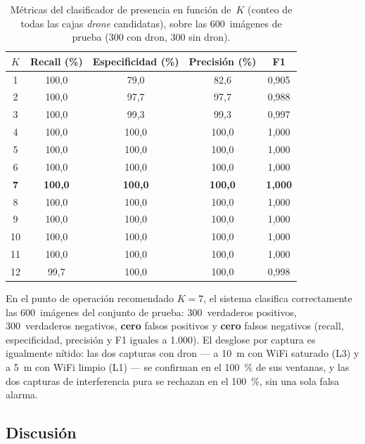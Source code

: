 \begin{table}[htbp]
\centering
\caption{Métricas del clasificador de presencia en función de~$K$ (conteo de todas las cajas \emph{drone} candidatas), sobre las \num{600}~imágenes de prueba (\num{300} con dron, \num{300} sin dron).}
\label{tab:presencia_sweep_k}
\begin{tabular}{ccccc}
\toprule
\textbf{$K$} & \textbf{Recall (\%)} & \textbf{Especificidad (\%)} & \textbf{Precisión (\%)} & \textbf{F1} \\
\midrule
1  & 100,0 & 79,0  & 82,6  & 0,905 \\
2  & 100,0 & 97,7  & 97,7  & 0,988 \\
3  & 100,0 & 99,3  & 99,3  & 0,997 \\
4  & 100,0 & 100,0 & 100,0 & 1,000 \\
5  & 100,0 & 100,0 & 100,0 & 1,000 \\
6  & 100,0 & 100,0 & 100,0 & 1,000 \\
\textbf{7}  & \textbf{100,0} & \textbf{100,0} & \textbf{100,0} & \textbf{1,000} \\
8  & 100,0 & 100,0 & 100,0 & 1,000 \\
9  & 100,0 & 100,0 & 100,0 & 1,000 \\
10 & 100,0 & 100,0 & 100,0 & 1,000 \\
11 & 100,0 & 100,0 & 100,0 & 1,000 \\
12 & 99,7  & 100,0 & 100,0 & 0,998 \\
\bottomrule
\end{tabular}
\end{table}

En el punto de operación recomendado $K=7$, el sistema clasifica correctamente las \num{600}~imágenes del conjunto de prueba: \num{300}~verdaderos positivos, \num{300}~verdaderos negativos, \textbf{cero} falsos positivos y \textbf{cero} falsos negativos (recall, especificidad, precisión y F1 iguales a \num{1,000}). El desglose por captura es igualmente nítido: las dos capturas con dron --- a \SI{10}{\meter} con WiFi saturado (L3) y a \SI{5}{\meter} con WiFi limpio (L1) --- se confirman en el \SI{100}{\percent} de sus ventanas, y las dos capturas de interferencia pura se rechazan en el \SI{100}{\percent}, sin una sola falsa alarma.

\subsection{Discusión}
\label{sec:p3_discusion}


